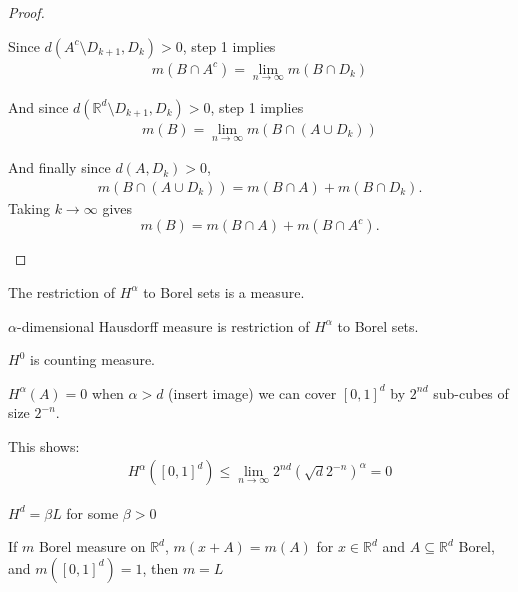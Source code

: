 \begin{proof}
\begin{enumerate}
			Since $d(A^{c} \setminus D_{k+1} , D_k) > 0$, step 1 implies
			\begin{align*}
				m(B \cap A^{c}) = \lim_{n \to \infty} m(B \cap D_k)
			\end{align*}

			And since $d(\mathbb{R}^d \setminus D_{k+1}, D_k ) > 0$, step 1 implies
			\begin{align*}
				m(B ) = \lim_{n \to \infty} m(B \cap (A \cup D_{k}))
			\end{align*}

			And finally since $d(A, D_{k}) > 0$,
			\begin{align*}
				m(B \cap (A \cup D_{k})) = m(B \cap A) + m(B \cap D_{k}).
			\end{align*}
			Taking $k \to \infty$ gives 
			\[
				m(B) = m(B \cap A) + m(B \cap A^{c}).
			\]
	\end{enumerate}

\end{proof}


\begin{theorem}
	The restriction of $H^{\alpha}$ to Borel sets is a measure.
\end{theorem}


\begin{definition}
	$\alpha$-dimensional Hausdorff measure is restriction of $H^{\alpha}$ to Borel sets.
\end{definition}


\begin{example}
	$H^{0}$ is counting measure.
\end{example}


\begin{example}
	$H^{\alpha} (A) = 0$ when $\alpha > d$
	(insert image) we can cover  $[0,1]^{d}$ by $2^{nd}$ sub-cubes of size $2^{-n}$.

	This shows:
	\begin{align*}
		H^{\alpha} ([0,1]^d) \leq \lim_{n \to \infty} 2^{nd}( \sqrt{d} 2^{-n})^{\alpha} = 0
	\end{align*}
\end{example}

\begin{example}
	$H^{d} = \beta L$ for some $\beta > 0$
\end{example}

\begin{theorem}
	If $m$ Borel measure on $\mathbb{R}^{d}$, $m(x + A) = m(A)$ for $x \in \mathbb{R}^d$ and $A \subseteq \mathbb{R}^d$ Borel, and $m([0,1]^{d}) =1$, then $m = L$
\end{theorem}

